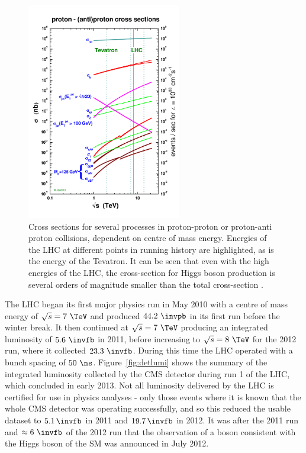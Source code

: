 \begin{figure}[htbp]
   \includegraphics[width=0.6\textwidth]{plots/detector/crosssections2012_v5.pdf}
\caption{Cross sections for several processes in proton-proton or proton-anti
proton collisions, dependent on centre of mass energy. Energies of the LHC at
different points in running history are highlighted, as is the energy of the
Tevatron. It can be seen that even with the high energies of the LHC, the
cross-section for Higgs boson production is several orders of magnitude smaller than
the total cross-section \cite{stirling:xsecs}.}
\label{fig:LHCcrosssections}
\end{figure}

The LHC began its first major physics run in May 2010 with a centre of mass
energy of $\sqrt{s} = 7~\TeV$ and produced $44.2~\invpb$ in its first run
before the winter break. It then continued at $\sqrt{s} = 7~\TeV$
producing an integrated luminosity of $5.6~\invfb$ in 2011, before increasing to
$\sqrt{s} = 8~\TeV$ for the 2012 run, where it collected $23.3~\invfb$.
During this time the LHC operated with a bunch spacing of $50~\ns$. 
Figure~\ref{fig:detlumi} shows the summary of the
integrated luminosity collected by the CMS detector during run 1 of the LHC,
which concluded in early 2013. Not all luminosity delivered by the LHC is
certified for use in physics analyses - only those events where it is known that
the whole CMS detector was operating successfully, and so this reduced the
usable dataset to $5.1\,\invfb$ in 2011 and $19.7\,\invfb$ in 2012.
It was after the 2011 run and $\approx6~\invfb$ of the 2012 run that the
observation of a boson consistent with the Higgs boson of the \ac{SM} was
announced in July 2012. 


